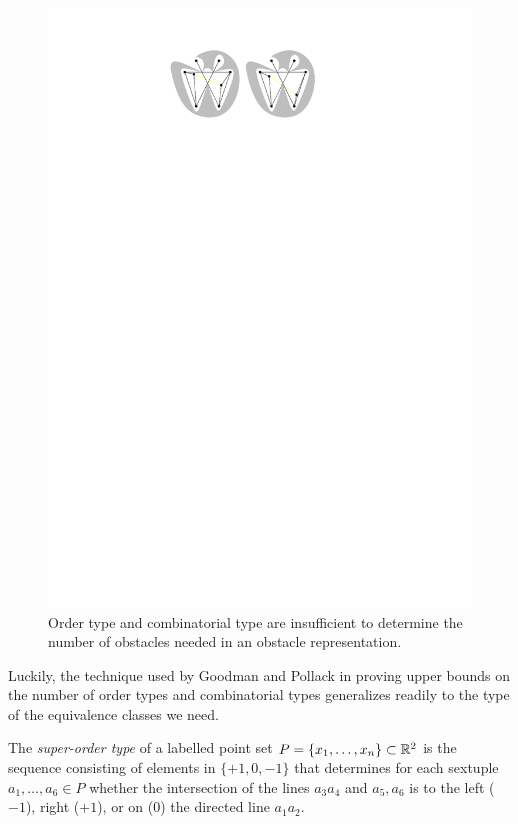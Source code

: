 \documentclass{patmorin}
\begin{document}
\begin{figure}
  \begin{center}
    \includegraphics{order-type}
  \end{center}
  \caption{Order type and combinatorial type are insufficient to determine 
      the number of obstacles needed in an obstacle representation.}
\end{figure}

Luckily, the technique used by Goodman and Pollack in proving upper
bounds on the number of order types and combinatorial types generalizes
readily to the type of the equivalence classes we need.

The \emph{super-order type} of a labelled point set
$P=\{x_1,\ldots,x_n\}\subset\mathbb{R}^2$ is the sequence consisting of elements
in $\{+1,0,-1\}$ that determines for each sextuple $a_1,\ldots,a_6\in P$
whether the intersection of the lines $a_3a_4$ and $a_5,a_6$ is to the
left ($-1$), right ($+1$), or on ($0$) the directed line $a_1a_2$.
\end{document}
